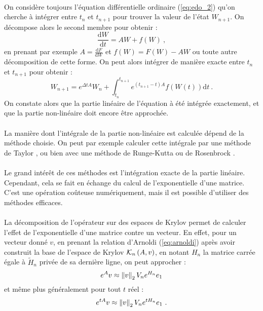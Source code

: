    \paragraph{}
    On considère toujours l'équation différentielle ordinaire (\ref{eq:edo_2}) qu'on cherche à intégrer entre $t_n$ et $t_{n+1}$ pour trouver la valeur de l'état $W_{n+1}$.
    On décompose alors le second membre pour obtenir :
    \[\frac{\mathrm{d}W}{\mathrm{d}t} = AW + f\left(W\right)\ ,\]
    en prenant par exemple $A = \frac{\mathrm{d}F}{\mathrm{d}W}$ et $f\left(W\right) = F\left(W\right) - AW$ ou toute autre décomposition de cette forme.
    On peut alors intégrer de manière exacte entre $t_n$ et $t_{n+1}$ pour obtenir :
    \[W_{n+1} = e^{\Delta tA}W_n + \int_{t_n}^{t_{n+1}}e^{\left(t_{n+1}-t\right)A}f\left(W\left(t\right)\right)\mathrm{d}t\ .\]
    On constate alors que la partie linéaire de l'équation à été intégrée exactement, et que la partie non-linéaire doit encore être approchée.

    \paragraph{}
    La manière dont l'intégrale de la partie non-linéaire est calculée dépend de la méthode choisie.
    On peut par exemple calculer cette intégrale par une méthode de Taylor \cite{KoskelaOstermann2013}, ou bien avec une méthode de Runge-Kutta ou de Rosenbrock \cite{HochbruckOstermann2010}.

    \paragraph{}
    Le grand intérêt de ces méthodes est l'intégration exacte de la partie linéaire.
    Cependant, cela se fait en échange du calcul de l'exponentielle d'une matrice.
    C'est une opération coûteuse numériquement, mais il est possible d'utiliser des méthodes efficaces.

    \paragraph{}
    La décomposition de l'opérateur sur des espaces de Krylov permet de calculer l'effet de l'exponentielle d'une matrice contre un vecteur.
    En effet, pour un vecteur donné $v$, en prenant la relation d'Arnoldi (\ref{eq:arnoldi}) après avoir construit la base de l'espace de Krylov $\krylov[A, v]{n}$, en notant $H_n$ la matrice carrée égale à $\widetilde{H}_n$ privée de sa dernière ligne, on peut approcher \cite{Saad1992} :
    \[e^Av \approx \norm[2]{v} V_ne^{H_n}e_1\]
    et même plus généralement pour tout $t$ réel :
    \[e^{tA}v \approx \norm[2]{v} V_ne^{tH_n}e_1\ .\]

